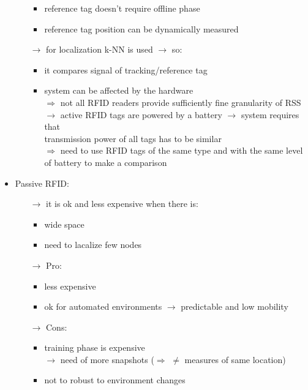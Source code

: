 \begin{itemize}
\begin{itemize}
\begin{itemize}
            \item reference tag doesn't require offline phase
            \item reference tag position can be dynamically measured
        \end{itemize} 
        \item[$\rightarrow$] for localization k-NN is used $\rightarrow$ so:
        \begin{itemize}
            \item it compares signal of tracking/reference tag
            \item system can be affected by the hardware\\[0.15cm]
            $\Rightarrow$ not all RFID readers provide sufficiently fine granularity of RSS\\[0.15cm]
            $\rightarrow$ active RFID tags are powered by a battery
            $\rightarrow$ system requires that\\transmission power of all tags has to be similar\\[0.15cm]
            $\Rightarrow$ need to use RFID tags of the same type and with the same level of battery to make a comparison
        \end{itemize}
    \end{itemize}
    \item Passive RFID:
    \begin{itemize}
        \item[$\rightarrow$] it is ok and less expensive when there is:
        \begin{itemize}
            \item wide space
            \item need to lacalize few nodes
        \end{itemize}
        \item[$\rightarrow$] Pro:
        \begin{itemize}
            \item less expensive
            \item ok for automated environments $\rightarrow$ predictable and low mobility
        \end{itemize}
        \item[$\rightarrow$] Cons:
        \begin{itemize}
            \item training phase is expensive\\$\rightarrow$ need of more snapshots ($\Rightarrow$ $\neq$ measures of same location)
            \item not to robust to environment changes
        \end{itemize}
    \end{itemize}
\end{itemize}

